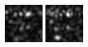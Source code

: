 \begin{figure}[ht]
\begin{center}
 \includegraphics[width=\columnwidth/9]{ch4/figures/mag_-1_1.jpg}
 \includegraphics[width=\columnwidth/9]{ch4/figures/mag_-1_2.jpg}

\end{center}
\end{figure}
